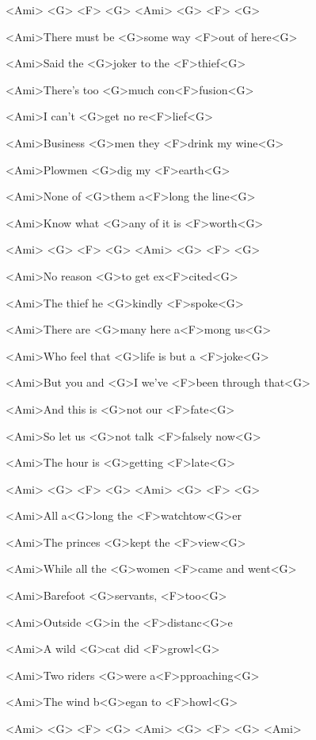 

<Ami> <G> <F> <G>
<Ami> <G> <F> <G>

\zs
<Ami>There must be <G>some way <F>out of here<G>

<Ami>Said the <G>joker to the <F>thief<G>

<Ami>There's too <G>much con<F>fusion<G>

<Ami>I can't <G>get no re<F>lief<G>

<Ami>Business <G>men they <F>drink my wine<G>

<Ami>Plowmen <G>dig my <F>earth<G>

<Ami>None of <G>them a<F>long the line<G>

<Ami>Know what <G>any of it is <F>worth<G>
\ks

<Ami> <G> <F> <G>
<Ami> <G> <F> <G>

\zs
<Ami>No reason <G>to get ex<F>cited<G>

<Ami>The thief he <G>kindly <F>spoke<G>

<Ami>There are <G>many here a<F>mong us<G>

<Ami>Who feel that <G>life is but a <F>joke<G>

<Ami>But you and <G>I we've <F>been through that<G>

<Ami>And this is <G>not our <F>fate<G>

<Ami>So let us <G>not talk <F>falsely now<G>

<Ami>The hour is <G>getting <F>late<G>
\ks

<Ami> <G> <F> <G>
<Ami> <G> <F> <G>

\zs
<Ami>All a<G>long the <F>watchtow<G>er

<Ami>The princes <G>kept the <F>view<G>

<Ami>While all the <G>women <F>came and went<G>

<Ami>Barefoot <G>servants, <F>too<G>

<Ami>Outside <G>in the <F>distanc<G>e

<Ami>A wild <G>cat did <F>growl<G>

<Ami>Two riders <G>were a<F>pproaching<G>

<Ami>The wind b<G>egan to <F>howl<G>
\ks

<Ami> <G> <F> <G>
<Ami> <G> <F> <G>
<Ami>

\kp
